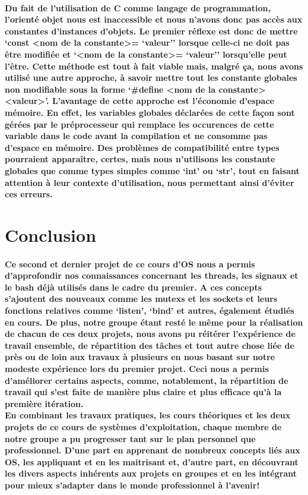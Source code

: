 \documentclass[utf8]{article}
\begin{document}
\paragraph{Du fait de l'utilisation de C comme langage de programmation, l'orienté objet nous est inaccessible et nous n'avons donc pas accès aux constantes d'instances d'objets. 
Le premier réflexe est donc de mettre `const \textless nom de la constante\textgreater= `valeur'' lorsque celle-ci ne doit pas être modifiée et `\textless nom de la 
constante\textgreater = `valeur'' lorsqu'elle peut l'être. Cette méthode est tout à fait viable mais, malgré ça, nous avons utilisé une autre approche, à savoir mettre tout 
les constante globales non modifiable sous la forme `\#define \textless nom de la constante\textgreater \textless valeur\textgreater'. L'avantage de cette approche est l'économie d'espace mémoire. 
En effet, les variables globales déclarées de cette façon sont gérées par le préprocesseur qui remplace les occurences de cette variable dans le code avant la compilation et ne consomme pas d'espace en mémoire.
Des problèmes de compatibilité entre types pourraient apparaître, certes, mais nous n'utilisons les constante globales que comme types simples comme `int' ou `str', tout en
faisant attention à leur contexte d'utilisation, nous permettant ainsi d'éviter ces erreurs.}

\section{Conclusion}
\paragraph{
Ce second et dernier projet de ce cours d'OS nous a permis d'approfondir nos connaissances concernant les threads, les signaux et le bash déjà utilisés dans le cadre du premier. A ces concepts
s'ajoutent des nouveaux comme les mutexs et les sockets et leurs fonctions relatives comme `listen', `bind' et autres, également étudiés en cours. De plus, notre groupe étant resté le même pour la
réalisation de chacun de ces deux projets, nous avons pu réitérer l'expérience de travail ensemble, de répartition des tâches et tout autre chose liée de près ou de loin aux travaux à plusieurs 
en nous basant sur notre modeste expérience lors du premier projet. Ceci nous a permis d'améliorer certains aspects, comme, notablement, la répartition de travail qui s'est faite de manière plus claire et plus
efficace qu'à la première itération. \\
En combinant les travaux pratiques, les cours théoriques et les deux projets de ce cours de systèmes d'exploitation, chaque membre de notre groupe a pu progresser tant sur le plan personnel que professionnel. 
D'une part en apprenant de nombreux concepts liés aux OS, les appliquant et en les maitrisant et, d'autre part, en découvrant les divers aspects inhérents aux projets en groupes et en les intégrant 
pour mieux s'adapter dans le monde professionnel à l'avenir!}
\end{document}
